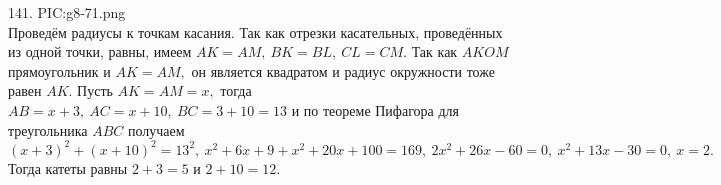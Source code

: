 141. {{PIC:g8-71.png}}\\
Проведём радиусы к точкам касания. Так как отрезки касательных, проведённых из одной точки, равны, имеем $AK=AM,\ BK=BL,\ CL=CM.$ Так как $AKOM$ прямоугольник и $AK=AM,$ он является квадратом и радиус окружности тоже равен $AK.$ Пусть $AK=AM=x,$ тогда $AB=x+3,\ AC=x+10,\ BC=3+10=13$ и по теореме Пифагора для треугольника $ABC$ получаем $(x+3)^2+(x+10)^2=13^2,\ x^2+6x+9+x^2+20x+100=169,\ 2x^2+26x-60=0,\ x^2+13x-30=0,\ x=2.$ Тогда катеты равны $2+3=5$ и $2+10=12.$\newpage\noindent
